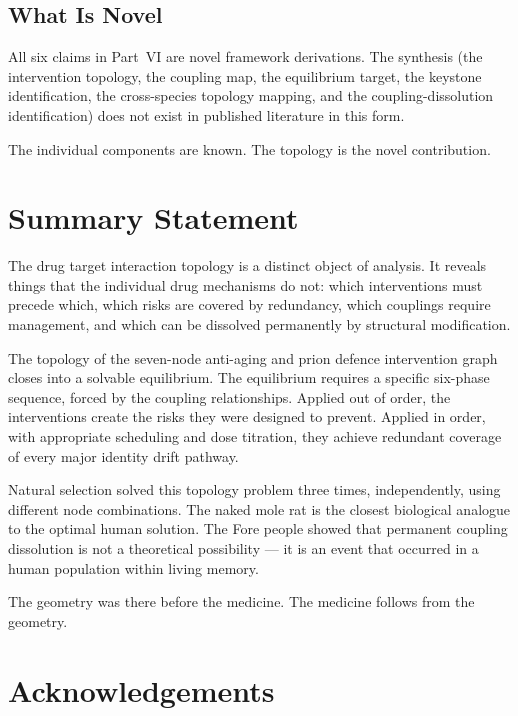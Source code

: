 \documentclass[12pt,a4paper]{article}
\begin{document}
\subsection{What Is Novel}

All six claims in Part~VI are novel framework derivations. The synthesis
(the intervention topology, the coupling map, the equilibrium target, the
keystone identification, the cross-species topology mapping, and the
coupling-dissolution identification) does not exist in published literature
in this form.

The individual components are known. The topology is the novel contribution.

\section*{Summary Statement}

The drug target interaction topology is a distinct object of analysis.
It reveals things that the individual drug mechanisms do not: which
interventions must precede which, which risks are covered by redundancy,
which couplings require management, and which can be dissolved permanently
by structural modification.

The topology of the seven-node anti-aging and prion defence intervention
graph closes into a solvable equilibrium. The equilibrium requires a
specific six-phase sequence, forced by the coupling relationships. Applied
out of order, the interventions create the risks they were designed to
prevent. Applied in order, with appropriate scheduling and dose titration,
they achieve redundant coverage of every major identity drift pathway.

Natural selection solved this topology problem three times, independently,
using different node combinations. The naked mole rat is the closest
biological analogue to the optimal human solution. The Fore people showed
that permanent coupling dissolution is not a theoretical possibility --- it
is an event that occurred in a human population within living memory.

The geometry was there before the medicine. The medicine follows from the
geometry.

\section*{Acknowledgements}
\end{document}
